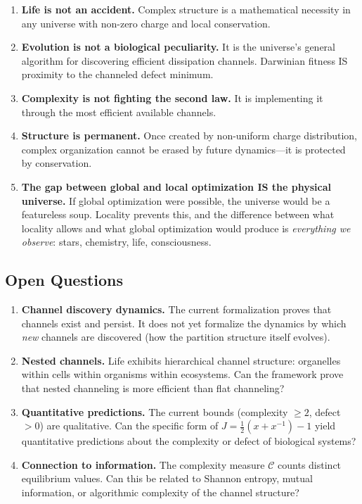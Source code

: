 \documentclass[11pt,a4paper]{article}
\theoremstyle{plain}
\theoremstyle{definition}
\theoremstyle{remark}
\newcommand{\Jcost}{J}
\begin{document}
\begin{enumerate}[nosep]
\item \textbf{Life is not an accident.}
Complex structure is a mathematical necessity in any universe with non-zero charge and local conservation.

\item \textbf{Evolution is not a biological peculiarity.}
It is the universe's general algorithm for discovering efficient dissipation channels.
Darwinian fitness IS proximity to the channeled defect minimum.

\item \textbf{Complexity is not fighting the second law.}
It is implementing it through the most efficient available channels.

\item \textbf{Structure is permanent.}
Once created by non-uniform charge distribution, complex organization cannot be erased by future dynamics---it is protected by conservation.

\item \textbf{The gap between global and local optimization IS the physical universe.}
If global optimization were possible, the universe would be a featureless soup.
Locality prevents this, and the difference between what locality allows and what global optimization would produce is \emph{everything we observe}: stars, chemistry, life, consciousness.
\end{enumerate}

\subsection{Open Questions}

\begin{enumerate}[nosep]
\item \textbf{Channel discovery dynamics.}
The current formalization proves that channels exist and persist.
It does not yet formalize the dynamics by which \emph{new} channels are discovered (how the partition structure itself evolves).

\item \textbf{Nested channels.}
Life exhibits hierarchical channel structure: organelles within cells within organisms within ecosystems.
Can the framework prove that nested channeling is more efficient than flat channeling?

\item \textbf{Quantitative predictions.}
The current bounds (complexity $\ge 2$, defect $> 0$) are qualitative.
Can the specific form of $\Jcost = \tfrac{1}{2}(x + x^{-1}) - 1$ yield quantitative predictions about the complexity or defect of biological systems?

\item \textbf{Connection to information.}
The complexity measure $\mathcal{C}$ counts distinct equilibrium values.
Can this be related to Shannon entropy, mutual information, or algorithmic complexity of the channel structure?
\end{enumerate}
\end{document}
